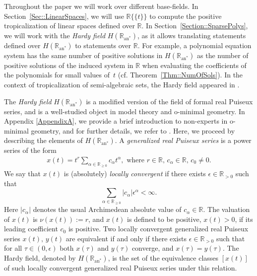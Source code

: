 \documentclass{article}
\theoremstyle{definition}
\begin{document}
Throughout the paper 
we will work over different base-fields. 
 In Section~\ref{Sec::LinearSpaces}, we will use $\mathbb{R}\{\!\{t \}\!\}$  to compute the positive tropicalization of linear spaces defined over $\mathbb{R}$. 
 In Section~\ref{Section::SparsePolys}, we will work with the \emph{Hardy field} $H(\mathbb{R}_{\text{an}^*})$, as it allows translating statements defined over $H(\mathbb{R}_{\text{an}^*})$ to statements over $\mathbb{R}$. For example, a polynomial equation system has the same number of positive solutions in $H(\mathbb{R}_{\text{an}^*})$  as the number of positive solutions of the induced system in $\mathbb{R}$ when evaluating the coefficients of the polynomials for small values of~$t$ (cf. Theorem~\ref{Thm::NumOfSols}). In the context of tropicalization of semi-algebraic sets, the Hardy field appeared in \cite{Alessandrini::LogLimit}.

The \emph{Hardy field} $H(\mathbb{R}_{\text{an}^*})$ \cite[Section 4.1]{Alessandrini::LogLimit} is a modified version of the field of formal real Puiseux series, and is a well-studied object in model theory and o-minimal geometry. 
In Appendix \ref{AppendixA}, we provide a brief introduction to non-experts in o-minimal geometry, and for further details, we refer to \cite{Alessandrini::LogLimit,Ebbinghaus::Logic}. Here, we proceed by describing the elements of $H(\mathbb{R}_{\text{an}^*})$. A \emph{generalized real Puiseux series} is a power series of the form
\begin{align}
\label{Eq::GenRealPuisSeries}
 x(t) = t^r \sum_{\alpha \in \mathbb{R}_{\geq 0}} c_\alpha t^\alpha, \text{ where } r \in \mathbb{R}, \, c_\alpha \in \mathbb{R}, \, c_0 \neq 0.
\end{align}
 We say that $x(t)$ is (absolutely) \emph{locally convergent} if there exists $\epsilon \in \mathbb{R}_{>0}$ such that 
\[ \sum_{\alpha \in \mathbb{R}_{\geq 0}} \lvert c_\alpha \rvert \epsilon^\alpha < \infty.\]
Here $ \lvert c_\alpha \rvert$ denotes the usual Archimedean absolute value of $c_\alpha \in \mathbb{R}$.
The valuation of $x(t)$ is $\nu(x(t)) := r$, and $x(t)$ is defined to be positive, $x(t) > 0$, if its leading coefficient $c_0$ is positive. Two locally convergent generalized real Puiseux series $x(t),\, y(t)$ are equivalent if and only if there exists $\epsilon \in \mathbb{R}_{>0}$ such that for all $\tau \in (0,\epsilon)$ both $x(\tau)$ and $y(\tau)$ converge, and $x(\tau) = y(\tau)$. The Hardy field, denoted by $H( \mathbb{R}_{\text{an}^*})$, is the set of the equivalence classes $[x(t)]$ of such locally convergent generalized real Puiseux series under this relation.
\end{document}
